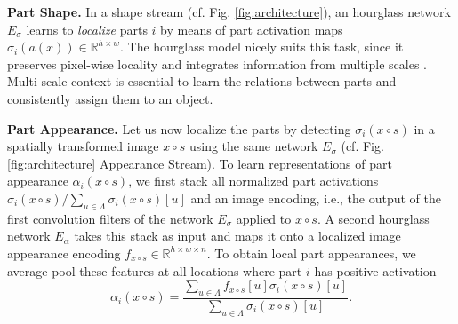     \textbf{Part Shape.}
    In a shape stream (cf. Fig. \ref{fig:architecture}), an hourglass network \cite{Newell:2016vq} $E_{\sigma}$ learns to \emph{localize} parts $i$ by means of part activation maps $\sigma_i(a(x)) \in \mathbb{R}^{h\times w}$.
    The hourglass model nicely suits this task, since it preserves pixel-wise locality and integrates information from multiple scales \cite{Newell:2016vq}. Multi-scale context is essential to learn the relations between parts and consistently assign them to an object.


    \textbf{Part Appearance.}
    Let us now localize the parts by detecting $\sigma_i(x {\circ} s)$ in a spatially transformed image $x {\circ} s$ using the same network $E_{\sigma}$ (cf. Fig. \ref{fig:architecture} Appearance Stream).
    To learn representations of part appearance $\alpha_i(x {\circ} s)$, we first stack all normalized part activations $\sigma_i(x {\circ} s)/\sum_{u \in \Lambda} \sigma_i(x {\circ} s)[u]$ and an image encoding, i.e., the output of the first convolution filters of the network $E_\sigma$ applied to $x{\circ} s$. A second hourglass network $E_{\alpha}$ takes this stack as input and maps it onto a localized image appearance encoding ${f_{x{\circ} s}} \in \mathbb{R}^{h\times w \times n}$. %
    To obtain local part appearances, we average pool these features at all locations where part $i$ has positive activation
    \begin{equation}
    \alpha_i(x {\circ} s) =
    \frac{ \sum_{u \in  \Lambda} f_{x{\circ} s}[u] \sigma_i(x {\circ} s)[u] }
    { \sum_{u \in  \Lambda} \sigma_i(x {\circ} s)[u] }
    \label{eq:appearance_encoding}.
    \end{equation}

